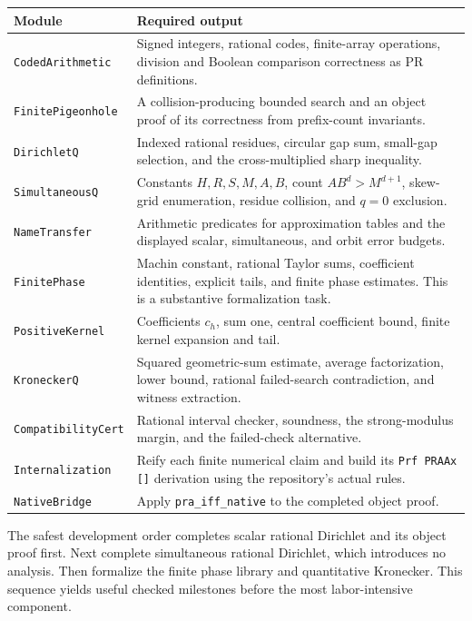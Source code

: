 \documentclass[11pt]{article}
\theoremstyle{definition}\newtheorem{definition}[theorem]{Definition}
\theoremstyle{remark}\newtheorem{remark}[theorem]{Remark}
\begin{document}
\begin{longtable}{>{\raggedright\arraybackslash}p{}>{\raggedright\arraybackslash}p{}}
\toprule
Module & Required output\\
\midrule\endhead
\texttt{CodedArithmetic} & Signed integers, rational codes, finite-array operations, division and Boolean comparison correctness as PR definitions.\\
\texttt{FinitePigeonhole} & A collision-producing bounded search and an object proof of its correctness from prefix-count invariants.\\
\texttt{DirichletQ} & Indexed rational residues, circular gap sum, small-gap selection, and the cross-multiplied sharp inequality.\\
\texttt{SimultaneousQ} & Constants $H,R,S,M,A,B$, count $AB^d>M^{d+1}$, skew-grid enumeration, residue collision, and $q=0$ exclusion.\\
\texttt{NameTransfer} & Arithmetic predicates for approximation tables and the displayed scalar, simultaneous, and orbit error budgets.\\
\texttt{FinitePhase} & Machin constant, rational Taylor sums, coefficient identities, explicit tails, and finite phase estimates. This is a substantive formalization task.\\
\texttt{PositiveKernel} & Coefficients $c_h$, sum one, central coefficient bound, finite kernel expansion and tail.\\
\texttt{KroneckerQ} & Squared geometric-sum estimate, average factorization, lower bound, rational failed-search contradiction, and witness extraction.\\
\texttt{CompatibilityCert} & Rational interval checker, soundness, the strong-modulus margin, and the failed-check alternative.\\
\texttt{Internalization} & Reify each finite numerical claim and build its \texttt{Prf PRAAx []} derivation using the repository's actual rules.\\
\texttt{NativeBridge} & Apply \texttt{pra\_iff\_native} to the completed object proof.\\
\bottomrule
\end{longtable}

The safest development order completes scalar rational Dirichlet and its object proof first. Next complete simultaneous rational Dirichlet, which introduces no analysis. Then formalize the finite phase library and quantitative Kronecker. This sequence yields useful checked milestones before the most labor-intensive component.
\end{document}
